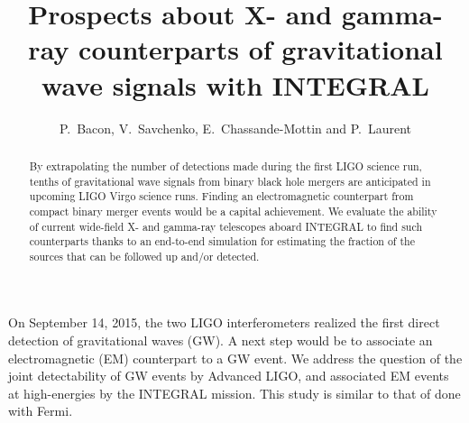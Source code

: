 \documentclass[11pt]{article}
\begin{document}
\title{Prospects about X- and gamma-ray counterparts of gravitational wave signals with INTEGRAL}
\author{P.~Bacon, V.~Savchenko, E.~Chassande-Mottin and P.~Laurent}


\begin{abstract}
  By extrapolating the number of detections made during the first LIGO science
  run, tenths of gravitational wave signals from binary black hole mergers are
  anticipated in upcoming LIGO Virgo science runs. Finding an electromagnetic
  counterpart from compact binary merger events would be a capital achievement.
  We evaluate the ability of current wide-field X- and gamma-ray telescopes
  aboard INTEGRAL to find such counterparts thanks to an end-to-end simulation
  for estimating the fraction of the sources that can be followed up and/or
  detected.
\end{abstract}

 
On September 14, 2015, the two LIGO interferometers realized the first direct detection of
gravitational waves (GW). A next step would be to associate an electromagnetic (EM)
counterpart to a GW event. We address the question of the joint detectability 
of GW events by Advanced LIGO, and associated EM events at high-energies by the 
INTEGRAL mission. This study is similar to that of \citep{2016arXiv160606124P} done with Fermi.
\end{document}
